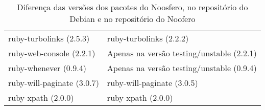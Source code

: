 \begin{table}[h]
\begin{tabular}{l|l}
        ruby-turbolinks (2.5.3)                          & ruby-turbolinks (2.2.2)                                  \\
        ruby-web-console (2.2.1)                         & Apenas na versão testing/unstable (2.2.1)                                  \\
        ruby-whenever (0.9.4)                            & Apenas na versão testing/unstable (0.9.4)                                  \\
        ruby-will-paginate (3.0.7)                       & ruby-will-paginate (3.0.5)                                  \\
        ruby-xpath (2.0.0)                               & ruby-xpath (2.0.0)                                  \\
        \hline
    \end{tabular}
\caption{Diferença das versões dos pacotes do Noosfero, no repositório do Debian e no repositório do Noofero}
\end{table}
